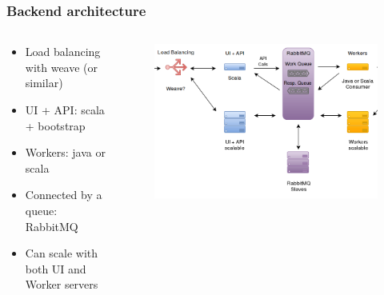 \documentclass[11pt]{beamer}
\begin{document}
\begin{frame}
\frametitle{Backend architecture}
\begin{columns}
    \begin{column}{.5\textwidth}
        \begin{itemize}
            \item Load balancing with weave (or similar)
            \item UI + API: scala + bootstrap
            \item Workers: java or scala
            \item Connected by a queue: RabbitMQ
            \item Can scale with both UI and Worker servers
        \end{itemize}
    \end{column}
    \begin{column}{.5\textwidth}
        \begin{figure}
        \centering
        \includegraphics[width=\linewidth]{backend.png}
        \end{figure}
    \end{column}
\end{columns}
\end{frame}
\end{document}
